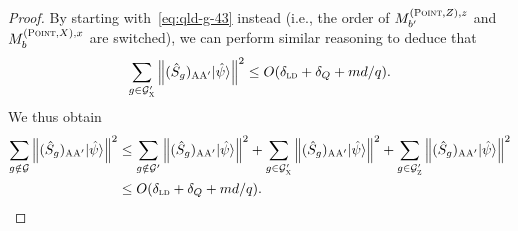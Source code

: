 \documentclass[11pt]{article}
\theoremstyle{definition}
\newcommand{\ket}[1]{|#1\rangle}
\newcommand{\ld}{\textsc{ld}}
\newcommand{\norm}[1]{\left\| {#1} \right\|}
\newcommand{\labelstyle}[1]{\ensuremath{\textsc{#1}}\xspace}
\newcommand{\xpt}{\labelstyle{X}}
\newcommand{\zpt}{\labelstyle{Z}}
\newcommand{\alice}{\labelstyle{A}}
\newcommand{\typestyle}[1]{\ensuremath{\textsc{#1}}\xspace}
\newcommand{\Point}{\typestyle{Point}}
\begin{document}
\begin{proof}
	By starting with~\eqref{eq:qld-g-43} instead (i.e., the order of $M^{(\Point,Z),z}_{b'}$ and $M^{(\Point,X),x}_b$ are switched), we can perform similar reasoning to deduce that
	\begin{equation}
	\label{eq:qld-g-prime-zpt-bound}
		\sum_{g \in \mathcal{G}'_\xpt} \norm{ (\hat{S}_g)_{\alice \alice'} \ket{\hat{\psi}}}^2 \leq O(\delta_\ld + \delta_Q + md/q).
	\end{equation}	
	We thus obtain
	\begin{align}
		\sum_{g \notin \mathcal{G}} \norm{ (\hat{S}_g)_{\alice \alice'} \ket{\hat{\psi}}}^2 &\leq 
		\sum_{g \notin \mathcal{G}'}\norm{ (\hat{S}_g)_{\alice \alice'} \ket{\hat{\psi}}}^2 +  \sum_{g \in \mathcal{G}'_\xpt}\norm{ (\hat{S}_g)_{\alice \alice'} \ket{\hat{\psi}}}^2 + \sum_{g \in \mathcal{G}'_\zpt}\norm{ (\hat{S}_g)_{\alice \alice'} \ket{\hat{\psi}}}^2 \\
		&\leq O(\delta_\ld + \delta_Q + md/q). 
		\label{eq:qld-g-non-separable}
	\end{align}
        

\end{proof}
\end{document}
